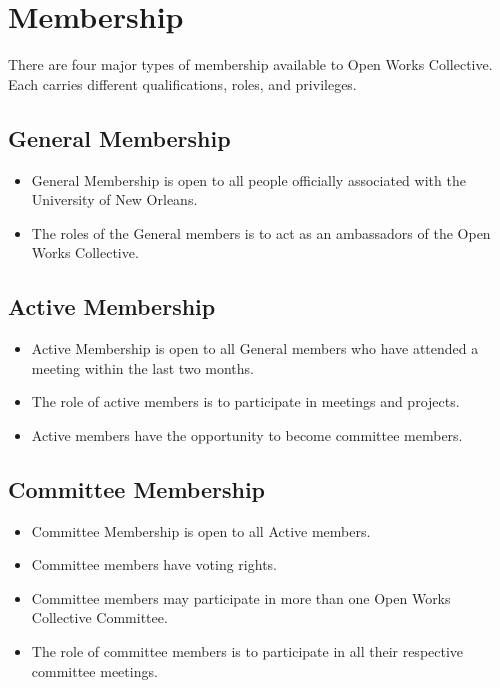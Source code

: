 \documentclass{article}
\newcommand{\article}[1]{\section{#1} \label{#1}}
\newcommand{\asection}[1]{\subsection{#1} \label{#1}}
\newcommand{\asubsection}[1]{\subsubsection{#1} \label{#1}}
\begin{document}
%
%
\newpage
\article{Membership}
There are four major types of membership available to Open Works Collective.
Each carries different qualifications, roles, and privileges.

	


\asection{General Membership}
\begin{itemize}
	\item General Membership is open to all people officially associated with the University of New Orleans.
	\item The roles of the General members is to act as an ambassadors of the Open Works Collective.
\end{itemize}

\asection{Active Membership}
\begin{itemize}
	\item Active Membership is open to all General members who have attended a meeting within the last two months.
	\item The role of active members is to participate in meetings and projects. 
	\item Active members have the opportunity to become committee members.
\end{itemize}

\asection{Committee Membership}
\begin{itemize}
	\item Committee Membership is open to all Active members.
	\item Committee members have voting rights.
	\item Committee members may participate in more than one Open Works Collective Committee.
	\item The role of committee members is to participate in all their respective committee meetings.
\end{itemize}
\end{document}
